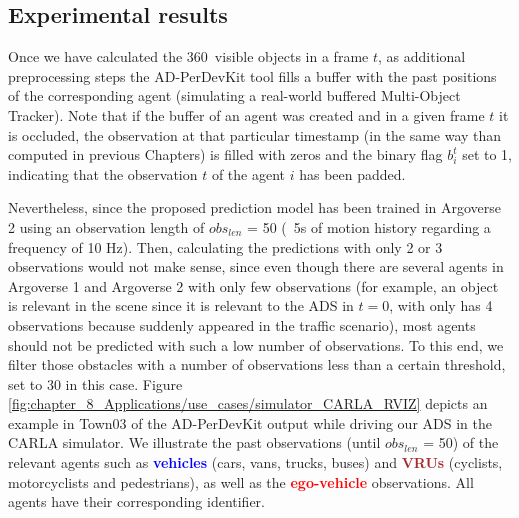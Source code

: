 \subsection{Experimental results}
\label{subsec:8_experimental_results}

Once we have calculated the 360\degree~visible objects in a frame $t$, as additional preprocessing steps the \ac{AD-PerDevKit} tool fills a buffer with the past positions of the corresponding agent (simulating a real-world buffered Multi-Object Tracker). Note that if the buffer of an agent was created and in a given frame $t$ it is occluded, the observation at that particular timestamp (in the same way than computed in previous Chapters) is filled with zeros and the binary flag $b_i^t$ set to 1, indicating that the observation $t$ of the agent $i$ has been padded. 

Nevertheless, since the proposed prediction model has been trained in Argoverse 2 using an observation length of \textit{$obs_{len}$} = 50 (\ie \ 5s of motion history regarding a frequency of 10 Hz). Then, calculating the predictions with only 2 or 3 observations would not make sense, since even though there are several agents in Argoverse 1 and Argoverse 2 with only few observations (for example, an object is relevant in the scene since it is relevant to the \ac{ADS} in $t=0$, with only has 4 observations because suddenly appeared in the traffic scenario), most agents should not be predicted with such a low number of observations. To this end, we filter those obstacles with a number of observations less than a certain threshold, set to 30 in this case. Figure \ref{fig:chapter_8_Applications/use_cases/simulator_CARLA_RVIZ} depicts an example in Town03 of the \ac{AD-PerDevKit} output while driving our \ac{ADS} in the \ac{CARLA} simulator. We illustrate the past observations (until \textit{$obs_{len}$} = 50) of the relevant agents such as \textbf{\textcolor{blue}{vehicles}} (cars, vans, trucks, buses) and \textbf{\textcolor{brown}{VRUs}} (cyclists, motorcyclists and pedestrians), as well as the \textbf{\textcolor{red}{ego-vehicle}} observations. All agents have their corresponding identifier.

